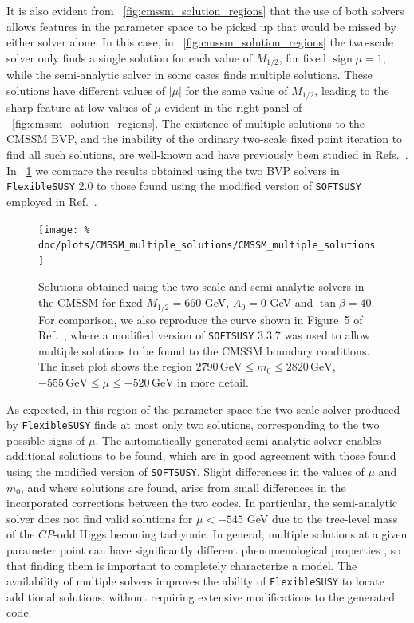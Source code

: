 \documentclass[final,3p,11pt,pdflatex]{elsarticle}
\makeatletter
\newcommand{\fs}{\texttt{FlexibleSUSY}\@\xspace}
\newcommand{\softsusy}{\texttt{SOFTSUSY}\@\xspace}
\newcommand{\fstwo}{\fs 2.0\@\xspace}
\newcommand{\unit}[1]{\,\text{#1}}      %
\newcommand{\figref}[1]{\figurename~\ref{#1}}
\newcommand{\CP}{\ensuremath{CP}\xspace}
\newcommand{\azero}{\ensuremath{A_0}\xspace}
\newcommand{\mhalf}{\ensuremath{M_{1/2}}\xspace}
\newcommand{\mzero}{\ensuremath{m_0}\xspace}
\DeclareMathOperator{\sign}{sign}
\makeatother
\begin{document}
It is also evident from \figref{fig:cmssm_solution_regions} that the use of
both solvers allows features in the parameter space to be picked up that would
be missed by either solver alone.  In this case, in 
\figref{fig:cmssm_solution_regions} the two-scale solver only finds a single 
solution for each value of $\mhalf$, for fixed $\sign\mu = 1$, while the 
semi-analytic solver in some cases finds multiple solutions.  These
solutions have different values of $|\mu|$ for the same value of $\mhalf$,
leading to the sharp feature at low values of $\mu$ evident in the right panel
of \figref{fig:cmssm_solution_regions}.  The existence of multiple solutions to
the CMSSM BVP, and the inability of the ordinary two-scale fixed point iteration
to find all such solutions, are well-known and have previously been studied in
Refs.~\cite{Allanach:2013cda,Allanach:2013yua}.  In
\figref{fig:cmssm_multiple_solutions} we compare the results obtained using
the two BVP solvers in \fstwo to those found using the modified version of
\softsusy employed in Ref.~\cite{Allanach:2013cda}.
%
\begin{figure}
  \centering
  \texttt{[image: \%
    doc/plots/CMSSM\_multiple\_solutions/CMSSM\_multiple\_solutions]}
  \caption{Solutions obtained using the two-scale and semi-analytic solvers
    in the CMSSM for fixed $\mhalf = 660$ GeV, $\azero = 0$ GeV and
    $\tan\beta = 40$.  For comparison, we also reproduce the curve shown in
    Figure~5 of Ref.~\cite{Allanach:2013cda}, where a modified version of
    \softsusy 3.3.7 was used to allow multiple solutions to be found to the
    CMSSM boundary conditions.  The inset plot shows the region $2790\unit{GeV}
    \leq \mzero \leq 2820\unit{GeV}$, $-555\unit{GeV} \leq \mu
    \leq -520\unit{GeV}$ in more detail.}
  \label{fig:cmssm_multiple_solutions}
\end{figure}
%
As expected, in this region of the parameter space the two-scale solver
produced by \fs finds at most only two solutions, corresponding to the two
possible signs of $\mu$.  The automatically generated semi-analytic solver
enables additional solutions to be found, which are in good agreement with
those found using the modified version of \softsusy.  Slight differences in
the values of $\mu$ and $\mzero$, and where solutions are found, arise from
small differences in the incorporated corrections between the two codes.  In
particular, the semi-analytic solver does not find valid solutions for
$\mu < -545$ GeV due to the tree-level mass of the \CP-odd Higgs becoming
tachyonic.  In general, multiple solutions at a given parameter point
can have significantly different phenomenological properties
\cite{Allanach:2013yua}, so that finding them is important to completely
characterize a model.  The availability of multiple solvers improves the
ability of \fs to locate additional solutions, without requiring extensive
modifications to the generated code.
\end{document}
